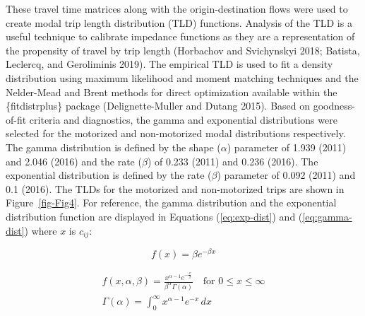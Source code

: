 \documentclass[
default
]{sn-jnl}
\begin{document}
These travel time matrices along with the origin-destination flows were
used to create modal trip length distribution (TLD) functions. Analysis
of the TLD is a useful technique to calibrate impedance functions as
they are a representation of the propensity of travel by trip length
(Horbachov and Svichynskyi 2018; Batista, Leclercq, and Geroliminis
2019). The empirical TLD is used to fit a density distribution using
maximum likelihood and moment matching techniques and the Nelder-Mead
and Brent methods for direct optimization available within the
\{fitdistrplus\} package (Delignette-Muller and Dutang 2015). Based on
goodness-of-fit criteria and diagnostics, the gamma and exponential
distributions were selected for the motorized and non-motorized modal
distributions respectively. The gamma distribution is defined by the
shape (\(\alpha\)) parameter of 1.939 (2011) and 2.046 (2016) and the
rate (\(\beta\)) of 0.233 (2011) and 0.236 (2016). The exponential
distribution is defined by the rate (\(\beta\)) parameter of 0.092
(2011) and 0.1 (2016). The TLDs for the motorized and non-motorized
trips are shown in Figure~\ref{fig-Fig4}. For reference, the gamma
distribution and the exponential distribution function are displayed in
Equations (\ref{eq:exp-dist}) and (\ref{eq:gamma-dist}) where \(x\) is
\(c_{ij}\):

\begin{equation}
\label{eq:exp-dist}
f(x) = \beta e ^{-\beta x}
\end{equation}

\begin{equation}
\label{eq:gamma-dist}
\begin{aligned}
f(x, \alpha, \beta) = \frac {x^{\alpha-1}e^{-\frac{x}{\beta}}}{ \beta^{\alpha}\Gamma(\alpha)} \quad \text{for } 0 \leq x \leq \infty \\
\Gamma(\alpha) =  \int_{0}^{\infty} x^{\alpha-1}e^{-x} \,dx
\end{aligned}
\end{equation}
\end{document}

